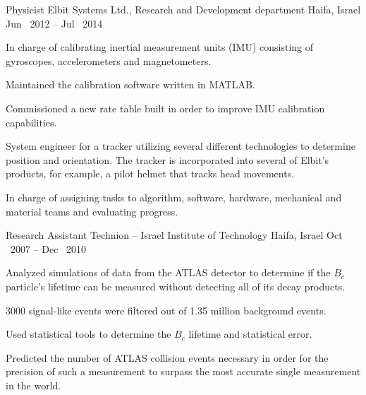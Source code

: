 \begin{cventries}
    \cventryWithTags
    {Physicist} %
    {Elbit Systems Ltd., Research and Development department} %
    {Haifa, Israel} %
    {Jun \ 2012 -- Jul \ 2014} %
    {}
    {
      \begin{cvitems} %
        \item {In charge of calibrating inertial measurement units (IMU) consisting of gyroscopes, accelerometers and magnetometers.}
        \item {Maintained the calibration software written in MATLAB.}
        \item {Commissioned a new rate table built in order to improve IMU calibration capabilities.}
        \item {System engineer for a tracker utilizing several different
          technologies to determine position and orientation. The tracker is incorporated into several of Elbit's products, for example, a pilot helmet that tracks head movements.}
        \item {In charge of assigning tasks to algorithm, software, hardware, mechanical and material teams and evaluating progress.}
      \end{cvitems}
    }

    \cventryWithTags
    {Research Assistant} %
    {Technion -- Israel Institute of Technology} %
    {Haifa, Israel} %
    {Oct \ 2007 -- Dec \ 2010} %
    {  } %
    {
      \begin{cvitems} %
        \item {Analyzed simulations of data from the ATLAS detector to determine if the $B_c$ particle's lifetime can be measured without detecting all of its decay products.  }
        \item {3000 signal-like events were filtered out of 1.35 million background events.}
        \item {Used statistical tools to determine the $B_c$ lifetime and statistical error.}
        \item {Predicted the number of ATLAS collision events necessary in order for the precision of such a measurement to surpass the most accurate single measurement in the world.}
      \end{cvitems}
    }
  \end{cventries}
